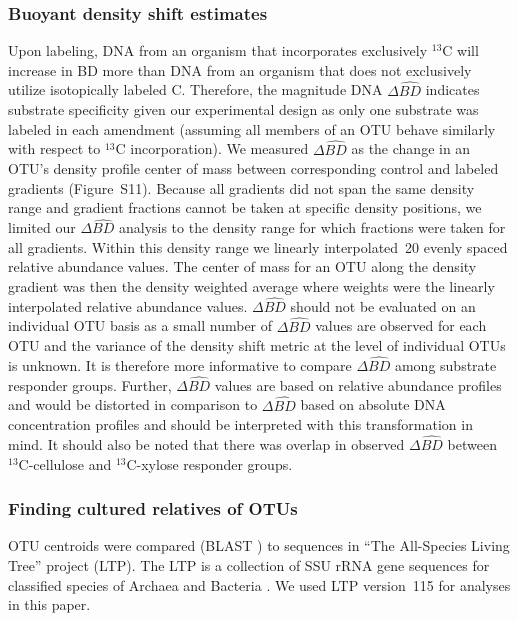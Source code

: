 \documentclass{article}
\begin{document}
\subsubsection{Buoyant density shift estimates}
Upon labeling, DNA from an organism that incorporates exclusively $^{13}$C will
increase in BD more than DNA from an organism that does not exclusively utilize
isotopically labeled C. Therefore, the magnitude DNA $\Delta\hat{BD}$ indicates
substrate specificity given our experimental design as only one substrate was
labeled in each amendment (assuming all members of an OTU behave similarly with
respect to $^{13}$C incorporation). We measured $\Delta\hat{BD}$ as the change in
an OTU's density profile center of mass between corresponding control and
labeled gradients (Figure~S11). Because all gradients did not span the same
density range and gradient fractions cannot be taken at specific density
positions, we limited our $\Delta\hat{BD}$ analysis to the density range for which
fractions were taken for all gradients. Within this density range we linearly
interpolated~20 evenly spaced relative abundance values. The center of mass for
an OTU along the density gradient was then the density weighted average where
weights were the linearly interpolated relative abundance values.
$\Delta\hat{BD}$ should not be evaluated on an individual OTU basis as a small
number of $\Delta\hat{BD}$ values are observed for each OTU and the variance of
the density shift metric at the level of individual OTUs is unknown. It is
therefore more informative to compare $\Delta\hat{BD}$ among substrate
responder groups. Further, $\Delta\hat{BD}$ values are based on relative
abundance profiles and would be distorted in comparison to $\Delta\hat{BD}$
based on absolute DNA concentration profiles and should be interpreted with
this transformation in mind. It should also be noted that there was overlap in
observed $\Delta\hat{BD}$ between $^{13}$C-cellulose and $^{13}$C-xylose
responder groups. 

\subsubsection{Finding cultured relatives of OTUs}
OTU centroids were compared (BLAST \citep{altschul2990,camacho2009}) to
sequences in ``The All-Species Living Tree'' project (LTP). The LTP is
a collection of SSU rRNA gene sequences for classified species of Archaea
and Bacteria \citep{yarza2008}. We used LTP version~115 for analyses in
this paper.
\end{document}
